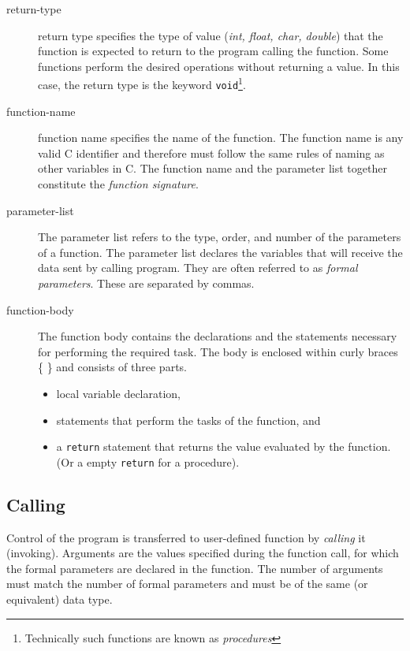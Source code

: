 \documentclass[11pt,a4paper]{article}
\begin{document}
\begin{description}
\item [return-type] return type specifies the type of value (\emph{int, float, char, double}) that the function is expected to return to the program calling the function.
Some functions perform the desired operations without returning a value. In this case, the return type is the keyword \lstinline!void!\footnote{Technically such functions are known as \emph{procedures}}.

\item [function-name]
function name specifies the name of the function. The function name is any valid C identifier and therefore must follow the same rules of naming as other variables in C. The function name and the parameter list together constitute the \emph{function signature}. 

\item [parameter-list]
The parameter list refers to the type, order, and number of the parameters of a function. The parameter list declares the variables that will receive the data sent by calling program. They are often referred to as \emph{formal parameters}. These are separated by commas.

\item [function-body]
The function body contains the declarations and the statements necessary for performing the required task. The body is enclosed within curly braces \{ \} and consists of three parts.

\begin{itemize}
\item local variable declaration,
\item statements that perform the tasks of the function, and
\item a \lstinline!return! statement that returns the value evaluated by the function. (Or a empty \lstinline!return! for a procedure).
\end{itemize}
\end{description}

\subsection*{Calling} 
Control of the program is transferred to user-defined function by \emph{calling} it (invoking). Arguments are the values specified during the function call, for which the formal parameters are declared in the function. The number of arguments must match the number of formal parameters and must be of the same (or equivalent) data type.
\end{document}
